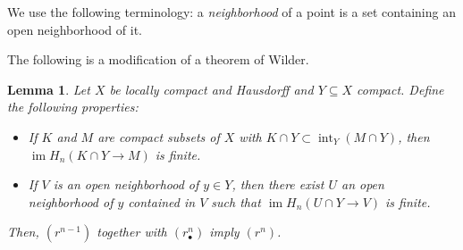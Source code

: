 \documentclass{amsart}
\newtheorem{lemma}[theorem]{Lemma}
\DeclareMathOperator{\im}{im}
\DeclareMathOperator{\interior}{int}
\begin{document}
	
	We use the following terminology: a \textit{neighborhood} of a point is a set containing an open neighborhood of it.
		
	The following is a modification of a theorem of Wilder.
	
	\begin{lemma} \label{l: wilder}
		Let $X$ be locally compact and Hausdorff and $Y \subseteq X$ compact. Define the following properties:
		\begin{itemize}
			\item[$(r^n)$] If $K$ and $M$ are compact subsets of $X$ with $K \cap Y \subset \interior_Y(M \cap Y)$, then $\im H_n\left(K \cap Y \to M\right)$ is finite.
			\item[$(r^n_\bullet)$] If $V$ is an open neighborhood of $y \in Y$, then there exist $U$ an open neighborhood of $y$ contained in $V$ such that $\im H_n\left(U \cap Y \to V\right)$ is finite.
		\end{itemize}
		Then, $(r^{n-1})$ together with $(r^n_\bullet)$ imply $(r^n)$.
	\end{lemma}
	
\end{document}
